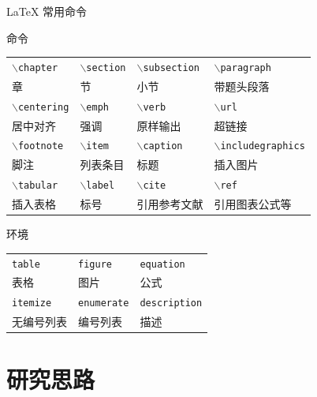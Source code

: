 \documentclass{beamer}
\def\cmd#1{\texttt{\color{red}\footnotesize $\backslash$#1}}
\def\env#1{\texttt{\color{blue}\footnotesize #1}}
\begin{document}
\begin{frame}[fragile]{\LaTeX{} 常用命令}
	\begin{exampleblock}{命令}
		\centering
		\footnotesize
		\begin{tabular}{llll}
			\cmd{chapter}   & \cmd{section} & \cmd{subsection} & \cmd{paragraph}       \\
			章               & 节             & 小节               & 带题头段落                 \\ \hline
			\cmd{centering} & \cmd{emph}    & \cmd{verb}       & \cmd{url}             \\
			居中对齐            & 强调            & 原样输出             & 超链接                   \\ \hline
			\cmd{footnote}  & \cmd{item}    & \cmd{caption}    & \cmd{includegraphics} \\
			脚注              & 列表条目          & 标题               & 插入图片                  \\ \hline
			\cmd{tabular}   & \cmd{label}   & \cmd{cite}       & \cmd{ref}             \\
			插入表格            & 标号            & 引用参考文献           & 引用图表公式等               \\ \hline
		\end{tabular}
	\end{exampleblock}
	\begin{exampleblock}{环境}
		\centering
		\footnotesize
		\begin{tabular}{lll}
			\env{table}   & \env{figure}    & \env{equation}    \\
			表格            & 图片              & 公式                \\\hline
			\env{itemize} & \env{enumerate} & \env{description} \\
			无编号列表         & 编号列表            & 描述                \\\hline
		\end{tabular}
	\end{exampleblock}
\end{frame}

\section{研究思路}
\end{document}
